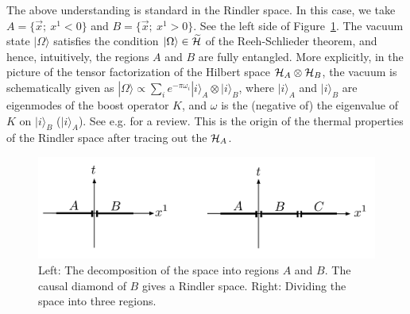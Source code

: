 \documentclass[12pt,a4paper]{article}
\theoremstyle{plain}
\theoremstyle{definition}
\numberwithin{thm}{section}
\newcommand{\ket}[1]{ | {#1} \rangle }
\def\CH{{\cal H}}
\begin{document}
The above understanding is standard in the Rindler space. In this case, we take $A=\{\vec{x}; ~ x^1<0 \}$ and
$B=\{\vec{x};~x^1>0 \}$. See the left side of Figure~\ref{fig:rindler}.
The vacuum state $\ket{\Omega}$ satisfies the condition $\ket{\Omega} \in \widetilde{\CH}$ of the Reeh-Schlieder theorem,
and hence, intuitively, the regions $A$ and $B$ are fully entangled. More explicitly, in the picture of the tensor factorization of the Hilbert space $\CH_A \otimes \CH_B$,
the vacuum is schematically given as $\ket{\Omega} \propto \sum_i e^{- \pi \omega_i} \ket{i}_A \otimes \ket{i}_B$, where $\ket{i}_A$ and $\ket{i}_B$ are eigenmodes of the boost operator $K$,
and $\omega$ is the (negative of) the eigenvalue of $K$ on $\ket{i}_B$ ($\ket{i}_A$).
See e.g. \cite{Harlow:2014yka} for a review.
This is the origin of the thermal properties of the Rindler space after tracing out the $\CH_A$.
\begin{figure}
\centering
\includegraphics[width=.8\textwidth]{rindler}
\caption{Left: The decomposition of the space into regions $A$ and $B$. The causal diamond of $B$ gives a Rindler space.
Right: Dividing the space into three regions.  \label{fig:rindler}}
\end{figure}
\end{document}
